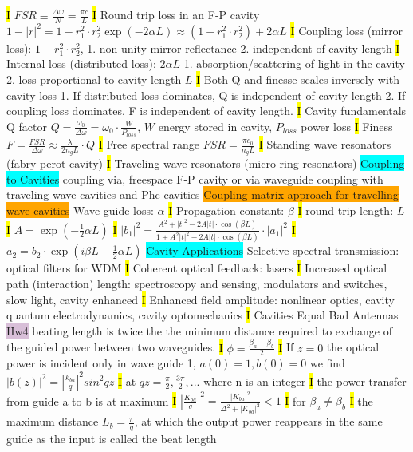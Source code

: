 \documentclass[fontsize=3]{scrartcl}
\begin{document}
\hl{I}
$FSR \equiv \frac{\Delta \omega}{N}  = \frac{\pi c}{L}$
\hl{I}
Round trip loss in an F-P cavity
$1-|r|^2 = 1 - r_1^2 \cdot r_2^2 \exp (-2 \alpha L) \approx (1 - r_1^2 \cdot r_2^2) + 2\alpha L$
\hl{I}
Coupling loss (mirror loss): $1-r_1^2 \cdot r_2^2$,
1. non-unity mirror reflectance
2. independent of cavity length
\hl{I}
Internal loss (distributed loss): $2 \alpha L$
1. absorption/scattering of light in the cavity
2. loss proportional to cavity length $L$
\hl{I}
Both Q and finesse scales inversely with cavity loss
1. If distributed loss dominates, Q is independent of cavity length
2. If coupling loss dominates, F is independent of cavity length.
\hl{I}
Cavity fundamentals 
Q factor $Q = \frac{\omega_0}{\Delta \omega} = \omega_0 \cdot \frac{W}{P_{loss}}$, $W$ energy stored in cavity, $P_{loss}$ power loss
\hl{I}
Finess $F = \frac{FSR}{\Delta \omega} \approx \frac{\lambda}{2 n_g L}\cdot Q $
\hl{I}
Free spectral range
$FSR = \frac{\pi c_0}{n_g L}$
\hl{I}
Standing wave resonators (fabry perot cavity)
\hl{I}
Traveling wave resonators (micro ring resonators)
\colorbox{Cyan}{Coupling to Cavities}
coupling via, freespace F-P cavity or via waveguide coupling with traveling wave cavities and Phc cavities
\colorbox{Orange}{Coupling matrix approach for travelling wave cavities}
Wave guide loss: $\alpha$
\hl{I}
Propagation constant: $\beta$
\hl{I}
round trip length: $L$
\hl{I}
$A = \exp(-\frac{1}{2} \alpha L)$
\hl{I}
$|b_1|^2 = \frac{A^2 + |t|^2 - 2A|t| \cdot \cos(\beta L) }{ 1+ A^2 |t|^2 - 2A|t| \cdot \cos(\beta L)} \cdot |a_1|^2$
\hl{I}
$a_2 = b_2 \cdot \exp(i \beta L - \frac{1}{2}\alpha L)$
\colorbox{Cyan}{Cavity Applications}
Selective spectral transmission: optical filters for WDM
\hl{I}
Coherent optical feedback: lasers
\hl{I}
Increased optical path (interaction) length:
spectroscopy and sensing, modulators and switches, slow light, cavity enhanced
\hl{I}
Enhanced field amplitude: nonlinear optics, cavity quantum electrodynamics, cavity optomechanics
\hl{I}
Cavities Equal Bad Antennas
\colorbox{Thistle}{Hw4}
beating length is twice the the minimum distance required to exchange of the guided power between two waveguides.
\hl{I}
$\phi = \frac{\beta_a + \beta_b}{2}$
\hl{I}
If $z =0$ the optical power is incident only in wave guide 1, $a(0) = 1, b(0)=0$ we find $|b(z)|^2 = |\frac{k_{ba}}{q}|^2 sin^2 qz$
\hl{I}
at $qz = \frac{\pi}{2}, \frac{3\pi}{2}, ...$ where n is an integer
\hl{I}
the power transfer from guide a to b is at maximum
\hl{I}
$|\frac{K_{ba}}{q}|^2 = \frac{|K_{ba}|^2}{\Delta^2 + |K_{ba}|^2} < 1$
\hl{I}
for $\beta_a \neq \beta_b$
\hl{I}
the maximum distance $L_b = \frac{\pi}{q}$, at which the output power reappears in the same guide as the input is called the beat length
\end{document}

